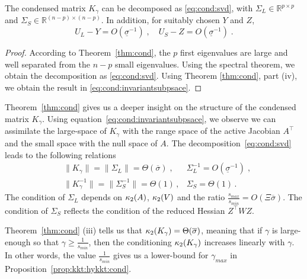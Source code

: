 \begin{corollary}
  The condensed matrix $K_\gamma$ can be decomposed as
  \eqref{eq:cond:svd}, with $\Sigma_L \in \mathbb{R}^{p \times p}$ and $\Sigma_S \in \mathbb{R}^{(n-p) \times (n-p)}$.
  In addition, for suitably chosen $Y$ and $Z$,
  \begin{equation}
    \label{eq:cond:invariantsubpsace}
    U_L - Y = O(\underline{\sigma}^{-1}) \; , \quad
    U_S - Z = O(\underline{\sigma}^{-1}) \; .
  \end{equation}
\end{corollary}
\begin{proof}
  According to Theorem~\ref{thm:cond}, the $p$ first eigenvalues are large
  and well separated from the $n - p$ small eigenvalues. Using
  the spectral theorem, we obtain the decomposition as \eqref{eq:cond:svd}.
  Using Theorem \ref{thm:cond}, part (iv), we obtain the result
  in \eqref{eq:cond:invariantsubpsace}.
\end{proof}
Theorem~\ref{thm:cond} gives us a deeper insight on the structure
of the condensed matrix $K_\gamma$.
Using equation~\eqref{eq:cond:invariantsubpsace}, we observe
we can assimilate the large-space of $K_\gamma$ with the range space of the
active Jacobian $A^\top$
and the small space with the null space of $A$.
The decomposition~\eqref{eq:cond:svd} leads to the following relations
\begin{equation}
  \label{eq:cond:boundinvariantsubspace}
  \begin{aligned}
    & \| K_\gamma \| = \| \Sigma_L \| = \Theta(\overline{\sigma}) \; , &
    \Sigma_L^{-1} = O(\underline{\sigma}^{-1})  \;, \\
    & \| K_\gamma^{-1} \| = \| \Sigma_S^{-1} \| = \Theta(1) \, , &
  \Sigma_S = \Theta(1) \, .
  \end{aligned}
\end{equation}
The condition of $\Sigma_L$ depends on $\kappa_2(A)$, $\kappa_2(V)$
and the ratio $\frac{s_{max}}{s_{min}} = O(\Xi \overline{\sigma})$.
The condition of $\Sigma_S$ reflects the condition of the reduced Hessian $Z^\top W Z$.

Theorem~\ref{thm:cond} (iii) tells us that $\kappa_2(K_\gamma) = \Theta(\overline{\sigma})$,
meaning that if $\gamma$ is large-enough so that $\gamma \geq \frac{1}{s_{min}}$, then
the conditioning $\kappa_2(K_\gamma)$ increases linearly with $\gamma$. In
other words, the value $\frac{1}{s_{min}}$ gives us a lower-bound for $\gamma_{max}$
in Proposition~\ref{prop:kkt:hykkt:cond}.

